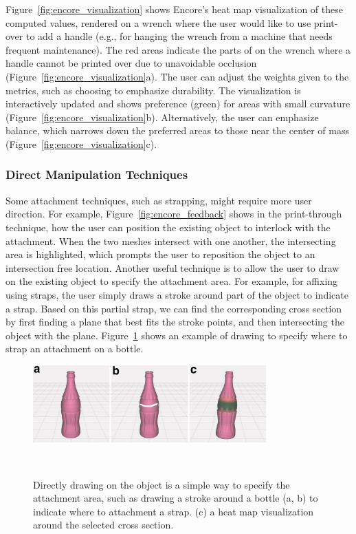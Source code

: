 Figure~\ref{fig:encore_visualization} shows Encore's heat map visualization of these computed values, rendered on a wrench where the user would like to use print-over to add a handle (e.g., for hanging the wrench from a machine that needs frequent maintenance). The red areas indicate the parts of on the wrench where a handle cannot be printed over due to unavoidable occlusion (Figure~\ref{fig:encore_visualization}a). The user can adjust the weights given to the metrics, such as choosing to emphasize durability. The visualization is interactively updated and shows preference (green) for areas with small curvature (Figure~\ref{fig:encore_visualization}b). Alternatively, the user can emphasize balance, which narrows down the preferred areas to those near the center of mass (Figure~\ref{fig:encore_visualization}c).

\subsubsection{Direct Manipulation Techniques}
Some attachment techniques, such as strapping, might require more user direction. For example, Figure~\ref{fig:encore_feedback} shows in the print-through technique, how the user can position the existing object to interlock with the attachment. When the two meshes intersect with one another, the intersecting area is highlighted, which prompts the user to reposition the object to an intersection free location.
Another useful technique is to allow the user to draw on the existing object to specify the attachment area. For example, for affixing using straps, the user simply draws a stroke around part of the object to indicate a strap. Based on this partial strap, we can find the corresponding cross section by first finding a plane that best fits the stroke points, and then intersecting the object with the plane. Figure~\ref{fig:encore_interaction} shows an example of drawing to specify where to strap an attachment on a bottle.

\begin{figure}[h]
  \centering
  \includegraphics[width=0.8\textwidth]{figures/encore_interaction.pdf}
  \caption{Directly drawing on the object is a simple way to specify the attachment area, such as drawing a stroke around a bottle (a, b) to indicate where to attachment a strap. (c) a heat map visualization around the selected cross section. }~\label{fig:encore_interaction}
\end{figure}

